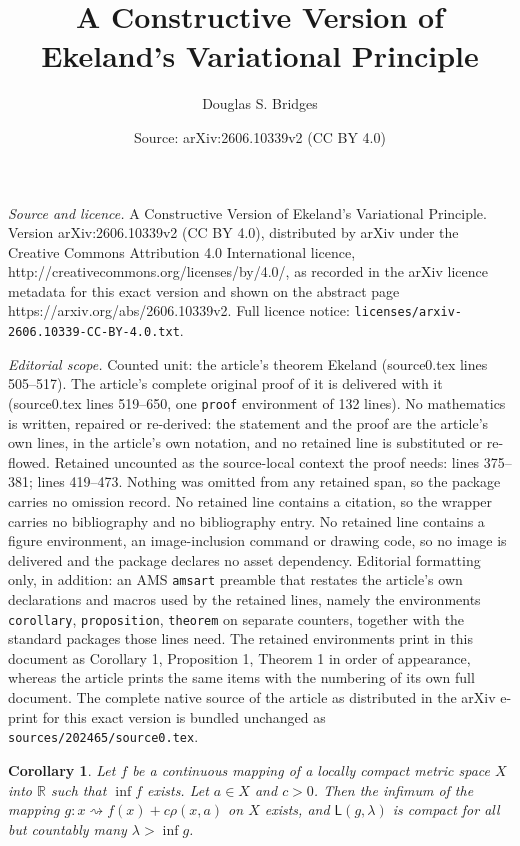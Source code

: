 \documentclass[10pt,a4paper]{amsart}
\title{\textsf{A Constructive Version of Ekeland's Variational Principle}}
\author{Douglas S. Bridges}
\date{Source: arXiv:2606.10339v2 (CC BY 4.0)}
\newtheorem{corollary}{Corollary}
\begin{document}
\maketitle

\noindent\emph{Source and licence.} \textsf{A Constructive Version of Ekeland's Variational Principle}. Version arXiv:2606.10339v2 (CC BY 4.0), distributed by arXiv under the Creative Commons Attribution 4.0 International licence, http://creativecommons.org/licenses/by/4.0/, as recorded in the arXiv licence metadata for this exact version and shown on the abstract page https://arxiv.org/abs/2606.10339v2. Full licence notice: \texttt{licenses/arxiv-2606.10339-CC-BY-4.0.txt}.\par\smallskip

\noindent\textit{Editorial scope.} Counted unit: the article's theorem Ekeland (source0.tex lines 505--517). The article's complete original proof of it is delivered with it (source0.tex lines 519--650, one \texttt{proof} environment of 132 lines). No mathematics is written, repaired or re-derived: the statement and the proof are the article's own lines, in the article's own notation, and no retained line is substituted or re-flowed.  Retained uncounted as the source-local context the proof needs: lines 375--381; lines 419--473.  Nothing was omitted from any retained span, so the package carries no omission record.  No retained line contains a citation, so the wrapper carries no bibliography and no bibliography entry.  No retained line contains a figure environment, an image-inclusion command or drawing code, so no image is delivered and the package declares no asset dependency.  Editorial formatting only, in addition: an AMS \texttt{amsart} preamble that restates the article's own declarations and macros used by the retained lines, namely the environments \texttt{corollary}, \texttt{proposition}, \texttt{theorem} on separate counters, together with the standard packages those lines need.  The retained environments print in this document as Corollary 1, Proposition 1, Theorem 1 in order of appearance, whereas the article prints the same items with the numbering of its own full document.  The complete native source of the article as distributed in the arXiv e-print for this exact version is bundled unchanged as \texttt{sources/202465/source0.tex}.
\begin{corollary}
\label{may25c3}Let $f$ be a continuous mapping of a locally compact metric
space $X$ into $\mathbb{R}$ such that $\inf f$ exists. Let $a\in X$ and $c>0$.
Then the infimum of the mapping $g:x\rightsquigarrow f(x)+c\rho(x,a)$ on $X$
exists, and $\mathsf{L}(g,\lambda)$ is compact for all but countably many
$\lambda>\inf g$.
\end{corollary}
\end{document}

